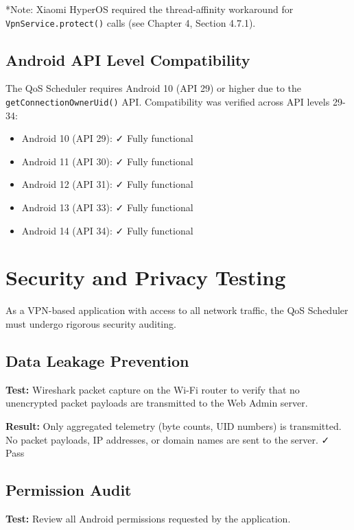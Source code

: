 *Note: Xiaomi HyperOS required the thread-affinity workaround for \texttt{VpnService.protect()} calls (see Chapter 4, Section 4.7.1).

\subsection{Android API Level Compatibility}

The QoS Scheduler requires Android 10 (API 29) or higher due to the \texttt{getConnectionOwnerUid()} API. Compatibility was verified across API levels 29-34:

\begin{itemize}
    \item Android 10 (API 29): ✓ Fully functional
    \item Android 11 (API 30): ✓ Fully functional
    \item Android 12 (API 31): ✓ Fully functional
    \item Android 13 (API 33): ✓ Fully functional
    \item Android 14 (API 34): ✓ Fully functional
\end{itemize}

\section{Security and Privacy Testing}
\label{sec:security_testing}

As a VPN-based application with access to all network traffic, the QoS Scheduler must undergo rigorous security auditing.

\subsection{Data Leakage Prevention}

\textbf{Test:} Wireshark packet capture on the Wi-Fi router to verify that no unencrypted packet payloads are transmitted to the Web Admin server.

\textbf{Result:} Only aggregated telemetry (byte counts, UID numbers) is transmitted. No packet payloads, IP addresses, or domain names are sent to the server. ✓ Pass

\subsection{Permission Audit}

\textbf{Test:} Review all Android permissions requested by the application.

